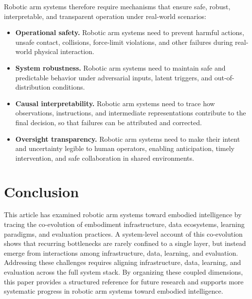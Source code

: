 \documentclass[acmsmall,screen,review]{acmart}
\begin{document}
Robotic arm systems therefore require mechanisms that ensure safe, robust, interpretable, and transparent operation under real-world scenarios:
\begin{itemize}
  \item \textbf{Operational safety.} Robotic arm systems need to prevent harmful actions, unsafe contact, collisions, force-limit violations, and other failures during real-world physical interaction.
  \item \textbf{System robustness.} Robotic arm systems need to maintain safe and predictable behavior under adversarial inputs, latent triggers, and out-of-distribution conditions.
  \item \textbf{Causal interpretability.} Robotic arm systems need to trace how observations, instructions, and intermediate representations contribute to the final decision, so that failures can be attributed and corrected.
  \item \textbf{Oversight transparency.} Robotic arm systems need to make their intent and uncertainty legible to human operators, enabling anticipation, timely intervention, and safe collaboration in shared environments.
\end{itemize}

\section{Conclusion}

This article has examined robotic arm systems toward embodied intelligence by tracing the co-evolution of embodiment infrastructure, data ecosystems, learning paradigms, and evaluation practices.
A system-level account of this co-evolution shows that recurring bottlenecks are rarely confined to a single layer, but instead emerge from interactions among infrastructure, data, learning, and evaluation.
Addressing these challenges requires aligning infrastructure, data, learning, and evaluation across the full system stack.
By organizing these coupled dimensions, this paper provides a structured reference for future research and supports more systematic progress in robotic arm systems toward embodied intelligence.



\end{document}
